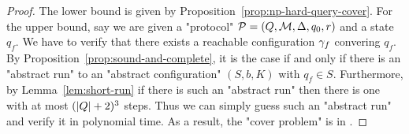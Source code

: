 

\thmNPComplete*

\begin{proof}
	The lower bound is given by Proposition~\ref{prop:np-hard-query-cover}.
	For the upper bound, say we are given a "protocol" $\mathcal{P} = (Q, \mathcal{M}, \Delta, q_0, r)$ and a state $q_f$. We have to verify that there exists a reachable configuration $\gamma_f$ convering $q_f$. By Proposition~\ref{prop:sound-and-complete}, it is the case if and only if there is an "abstract run" to an "abstract configuration" $(S,b, K)$ with $q_f \in S$.
	Furthermore, by Lemma~\ref{lem:short-run} if there is such an "abstract run" then there is one with at most $(|Q|+2)^3$ steps. 
	Thus we can simply guess such an "abstract run" and verify it in polynomial time.
	As a result, the "cover problem" is in \NP. 
\end{proof}